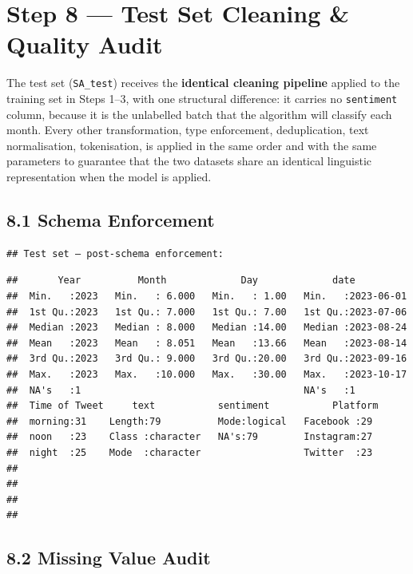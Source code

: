 \documentclass[
]{article}
\begin{document}
\section{Step 8 --- Test Set Cleaning \& Quality
Audit}\label{step-8-test-set-cleaning-quality-audit}

The test set (\texttt{SA\_test}) receives the \textbf{identical cleaning
pipeline} applied to the training set in Steps 1--3, with one structural
difference: it carries no \texttt{sentiment} column, because it is the
unlabelled batch that the algorithm will classify each month. Every
other transformation, type enforcement, deduplication, text
normalisation, tokenisation, is applied in the same order and with the
same parameters to guarantee that the two datasets share an identical
linguistic representation when the model is applied.

\subsection{8.1 Schema Enforcement}\label{schema-enforcement}

\begin{verbatim}
## Test set — post-schema enforcement:
\end{verbatim}

\begin{verbatim}
##       Year          Month             Day             date           
##  Min.   :2023   Min.   : 6.000   Min.   : 1.00   Min.   :2023-06-01  
##  1st Qu.:2023   1st Qu.: 7.000   1st Qu.: 7.00   1st Qu.:2023-07-06  
##  Median :2023   Median : 8.000   Median :14.00   Median :2023-08-24  
##  Mean   :2023   Mean   : 8.051   Mean   :13.66   Mean   :2023-08-14  
##  3rd Qu.:2023   3rd Qu.: 9.000   3rd Qu.:20.00   3rd Qu.:2023-09-16  
##  Max.   :2023   Max.   :10.000   Max.   :30.00   Max.   :2023-10-17  
##  NA's   :1                                       NA's   :1           
##  Time of Tweet     text           sentiment           Platform 
##  morning:31    Length:79          Mode:logical   Facebook :29  
##  noon   :23    Class :character   NA's:79        Instagram:27  
##  night  :25    Mode  :character                  Twitter  :23  
##                                                                
##                                                                
##                                                                
## 
\end{verbatim}

\subsection{8.2 Missing Value Audit}\label{missing-value-audit-1}
\end{document}
